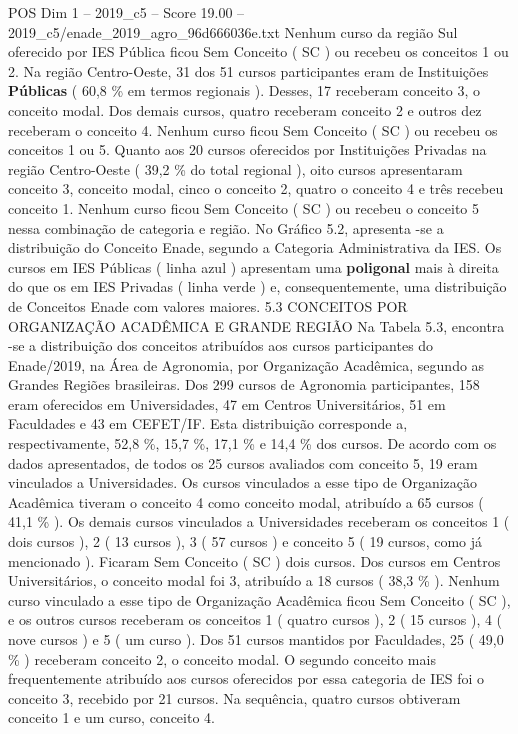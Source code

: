 \begin{textsample}{POS Dim 1 – 2019\_c5 – Score 19.00 – 2019\_c5/enade\_2019\_agro\_96d666036e.txt}
Nenhum curso da região Sul oferecido por IES Pública ficou Sem Conceito ( SC ) ou recebeu os conceitos 1 ou 2.
Na região Centro-Oeste, 31 dos 51 cursos participantes eram de Instituições \textbf{Públicas} ( 60,8 \% em termos regionais ).
Desses, 17 receberam conceito 3, o conceito modal.
Dos demais cursos, quatro receberam conceito 2 e outros dez receberam o conceito 4.
Nenhum curso ficou Sem Conceito ( SC ) ou recebeu os conceitos 1 ou 5.
Quanto aos 20 cursos oferecidos por Instituições Privadas na região Centro-Oeste ( 39,2 \% do total regional ), oito cursos apresentaram conceito 3, conceito modal, cinco o conceito 2, quatro o conceito 4 e três recebeu conceito 1.
Nenhum curso ficou Sem Conceito ( SC ) ou recebeu o conceito 5 nessa combinação de categoria e região.
No Gráfico 5.2, apresenta -se a distribuição do Conceito Enade, segundo a Categoria Administrativa da IES.
Os cursos em IES Públicas ( linha azul ) apresentam uma \textbf{poligonal} mais à direita do que os em IES Privadas ( linha verde ) e, consequentemente, uma distribuição de Conceitos Enade com valores maiores. 5.3 CONCEITOS POR ORGANIZAÇÃO ACADÊMICA E GRANDE REGIÃO Na Tabela 5.3, encontra -se a distribuição dos conceitos atribuídos aos cursos participantes do Enade/2019, na Área de Agronomia, por Organização Acadêmica, segundo as Grandes Regiões brasileiras.
Dos 299 cursos de Agronomia participantes, 158 eram oferecidos em Universidades, 47 em Centros Universitários, 51 em Faculdades e 43 em CEFET/IF.
Esta distribuição corresponde a, respectivamente, 52,8 \%, 15,7 \%, 17,1 \% e 14,4 \% dos cursos.
De acordo com os dados apresentados, de todos os 25 cursos avaliados com conceito 5, 19 eram vinculados a Universidades.
Os cursos vinculados a esse tipo de Organização Acadêmica tiveram o conceito 4 como conceito modal, atribuído a 65 cursos ( 41,1 \% ).
Os demais cursos vinculados a Universidades receberam os conceitos 1 ( dois cursos ), 2 ( 13 cursos ), 3 ( 57 cursos ) e conceito 5 ( 19 cursos, como já mencionado ).
Ficaram Sem Conceito ( SC ) dois cursos.
Dos cursos em Centros Universitários, o conceito modal foi 3, atribuído a 18 cursos ( 38,3 \% ).
Nenhum curso vinculado a esse tipo de Organização Acadêmica ficou Sem Conceito ( SC ), e os outros cursos receberam os conceitos 1 ( quatro cursos ), 2 ( 15 cursos ), 4 ( nove cursos ) e 5 ( um curso ).
Dos 51 cursos mantidos por Faculdades, 25 ( 49,0 \% ) receberam conceito 2, o conceito modal.
O segundo conceito mais frequentemente atribuído aos cursos oferecidos por essa categoria de IES foi o conceito 3, recebido por 21 cursos.
Na sequência, quatro cursos obtiveram conceito 1 e um curso, conceito 4.

\end{textsample}
